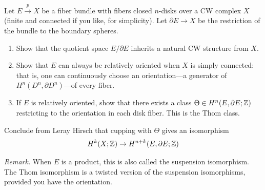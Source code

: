 \documentclass[12pt]{article}  %
\begin{document}
\begin{problem}
Let $E\xrightarrow{\,p\,} X$ be a fiber bundle with fibers closed $n$-disks over a CW complex $X$
(finite and connected if you like, for simplicity). Let $\partial E \to X$ be the restriction of the bundle to the boundary spheres.
\begin{enumerate}
\item Show that the quotient space $E/\partial E$ inherits a natural CW structure from $X$.
\item Show that $E$ can always be relatively oriented when $X$ is simply connected: that is, one can
continuously choose an orientation---a generator of $H^n(D^n,\partial D^n)$---of every fiber.
\item If $E$ is relatively oriented, show that there exists a class $\Theta \in H^n(E,\partial E;\mathbb{Z})$ restricting to the
orientation in each disk fiber. This is the Thom class.
\end{enumerate}
Conclude from Leray Hirsch that cupping with $\Theta$ gives an isomorphism
\[H^k(X;\mathbb{Z})\to H^{n+k}(E,\partial E;\mathbb{Z})\]

\noindent\textit{Remark.} When $E$ is a product, this is also called the suspension isomorphism. The Thom isomorphism is a twisted
version of the suspension isomorphisms, provided you have the orientation.
\end{problem}
\end{document}
